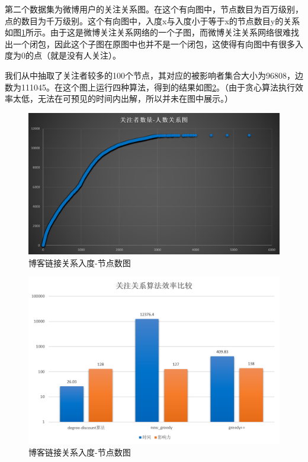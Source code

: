 \documentclass[11pt, a4paper]{article}
\begin{document}
  第二个数据集为微博用户的关注关系图。在这个有向图中，节点数目为百万级别，点的数目为千万级别。这个有向图中，入度x与入度小于等于x的节点数目y的关系如图\ref{fig:weibo}所示。由于这是微博关注关系网络的一个子图，而微博关注关系网络很难找出一个闭包，因此这个子图在原图中也并不是一个闭包，这使得有向图中有很多入度为0的点（就是没有人关注）。

  我们从中抽取了关注者较多的100个节点，其对应的被影响者集合大小为96808，边数为111045。在这个图上运行四种算法，得到的结果如图\ref{fig:weibo_res}。（由于贪心算法执行效率太低，无法在可预见的时间内出解，所以并未在图中展示。）


  \begin{figure}[H]
    \centering
    \includegraphics[width=5in]{images/weibo.png}
    \caption{博客链接关系入度-节点数图}\label{fig:weibo}
  \end{figure}

  \begin{figure}[H]
    \centering
    \includegraphics[width=5in]{images/weibo_res.png}
    \caption{博客链接关系入度-节点数图}\label{fig:weibo_res}
  \end{figure}
\end{document}
